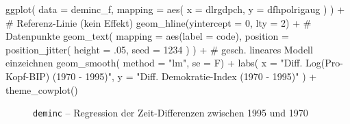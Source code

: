 \documentclass[
  a4paper,
  DIV=11,
  oneside]{scrreprt}
\newenvironment{Shaded}{\begin{snugshade}}{\end{snugshade}}
\newcommand{\AttributeTok}[1]{\textcolor[rgb]{0.40,0.45,0.13}{#1}}
\newcommand{\CommentTok}[1]{\textcolor[rgb]{0.37,0.37,0.37}{#1}}
\newcommand{\DecValTok}[1]{\textcolor[rgb]{0.68,0.00,0.00}{#1}}
\newcommand{\FunctionTok}[1]{\textcolor[rgb]{0.28,0.35,0.67}{#1}}
\newcommand{\NormalTok}[1]{\textcolor[rgb]{0.00,0.23,0.31}{#1}}
\newcommand{\SpecialCharTok}[1]{\textcolor[rgb]{0.37,0.37,0.37}{#1}}
\newcommand{\StringTok}[1]{\textcolor[rgb]{0.13,0.47,0.30}{#1}}
\begin{document}
\begin{Shaded}
\begin{Highlighting}[]
\FunctionTok{ggplot}\NormalTok{(}
  \AttributeTok{data =}\NormalTok{ deminc\_f,}
  \AttributeTok{mapping =} \FunctionTok{aes}\NormalTok{(}
    \AttributeTok{x =}\NormalTok{ dlrgdpch,}
    \AttributeTok{y =}\NormalTok{ dfhpolrigaug}
\NormalTok{  ) }
\NormalTok{  ) }\SpecialCharTok{+}
  \CommentTok{\# Referenz{-}Linie (kein Effekt)}
  \FunctionTok{geom\_hline}\NormalTok{(}\AttributeTok{yintercept =} \DecValTok{0}\NormalTok{, }\AttributeTok{lty =} \DecValTok{2}\NormalTok{) }\SpecialCharTok{+}
  \CommentTok{\# Datenpunkte}
  \FunctionTok{geom\_text}\NormalTok{(}
    \AttributeTok{mapping =} \FunctionTok{aes}\NormalTok{(}\AttributeTok{label =}\NormalTok{ code),}
    \AttributeTok{position =} \FunctionTok{position\_jitter}\NormalTok{(}
      \AttributeTok{height =}\NormalTok{ .}\DecValTok{05}\NormalTok{, }
      \AttributeTok{seed =} \DecValTok{1234}
\NormalTok{      )}
\NormalTok{    ) }\SpecialCharTok{+}
  \CommentTok{\# gesch. lineares Modell einzeichnen}
  \FunctionTok{geom\_smooth}\NormalTok{(}
    \AttributeTok{method =} \StringTok{"lm"}\NormalTok{, }
    \AttributeTok{se =}\NormalTok{ F) }\SpecialCharTok{+}
  \FunctionTok{labs}\NormalTok{(}
    \AttributeTok{x =} \StringTok{"Diff. Log(Pro{-}Kopf{-}BIP) (1970 {-} 1995)"}\NormalTok{,}
    \AttributeTok{y =} \StringTok{"Diff. Demokratie{-}Index (1970 {-} 1995)"}
\NormalTok{  ) }\SpecialCharTok{+}
  \FunctionTok{theme\_cowplot}\NormalTok{()}
\end{Highlighting}
\end{Shaded}

\begin{figure}[t]


\caption{\label{fig-acemfig2}\texttt{deminc} -- Regression der
Zeit-Differenzen zwischen 1995 und 1970}

\end{figure}%
\end{document}
